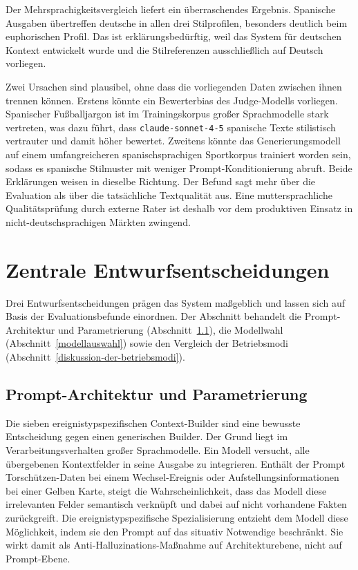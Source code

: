 Der Mehrsprachigkeitsvergleich liefert ein überraschendes Ergebnis. Spanische Ausgaben übertreffen deutsche in allen drei Stilprofilen, besonders deutlich beim euphorischen Profil. Das ist erklärungsbedürftig, weil das System für deutschen Kontext entwickelt wurde und die Stilreferenzen ausschließlich auf Deutsch vorliegen.

Zwei Ursachen sind plausibel, ohne dass die vorliegenden Daten zwischen ihnen trennen können. Erstens könnte ein Bewerterbias des Judge-Modells vorliegen. Spanischer Fußballjargon ist im Trainingskorpus großer Sprachmodelle stark vertreten, was dazu führt, dass \texttt{claude-sonnet-4-5} spanische Texte stilistisch vertrauter und damit höher bewertet. Zweitens könnte das Generierungsmodell auf einem umfangreicheren spanischsprachigen Sportkorpus trainiert worden sein, sodass es spanische Stilmuster mit weniger Prompt-Konditionierung abruft. Beide Erklärungen weisen in dieselbe Richtung. Der Befund sagt mehr über die Evaluation als über die tatsächliche Textqualität aus. Eine muttersprachliche Qualitätsprüfung durch externe Rater ist deshalb vor dem produktiven Einsatz in nicht-deutschsprachigen Märkten zwingend.

\section{Zentrale Entwurfsentscheidungen}\label{designentscheidungen}

Drei Entwurfsentscheidungen prägen das System maßgeblich und lassen sich auf Basis der Evaluationsbefunde einordnen. Der Abschnitt behandelt die Prompt-Architektur und Parametrierung (Abschnitt~\ref{diskussion-der-prompt-architektur}), die Modellwahl (Abschnitt~\ref{modellauswahl}) sowie den Vergleich der Betriebsmodi (Abschnitt~\ref{diskussion-der-betriebsmodi}).

\subsection{Prompt-Architektur und Parametrierung}\label{diskussion-der-prompt-architektur}

Die sieben ereignistypspezifischen Context-Builder sind eine bewusste Entscheidung gegen einen generischen Builder. Der Grund liegt im Verarbeitungsverhalten großer Sprachmodelle. Ein Modell versucht, alle übergebenen Kontextfelder in seine Ausgabe zu integrieren. Enthält der Prompt Torschützen-Daten bei einem Wechsel-Ereignis oder Aufstellungsinformationen bei einer Gelben Karte, steigt die Wahrscheinlichkeit, dass das Modell diese irrelevanten Felder semantisch verknüpft und dabei auf nicht vorhandene Fakten zurückgreift. Die ereignistypspezifische Spezialisierung entzieht dem Modell diese Möglichkeit, indem sie den Prompt auf das situativ Notwendige beschränkt. Sie wirkt damit als Anti-Halluzinations-Maßnahme auf Architekturebene, nicht auf Prompt-Ebene.

